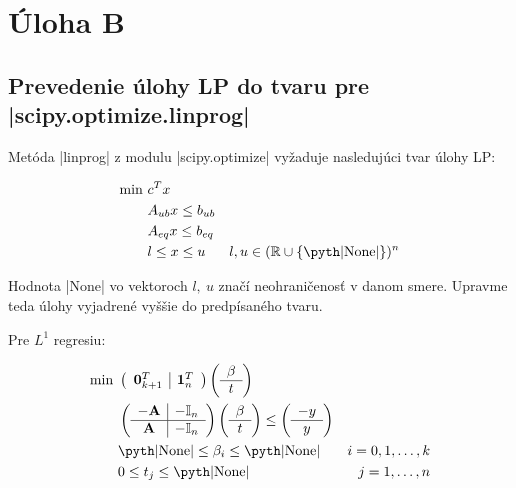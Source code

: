 \documentclass[report.tex]{subfiles}
\begin{document}
   

\section{Úloha B}\label{sec:B}


\subsection{Prevedenie úlohy LP do tvaru pre \pyth|scipy.optimize.linprog|}

Metóda \pyth|linprog| z modulu \pyth|scipy.optimize| vyžaduje nasledujúci tvar úlohy LP:

\begin{align*}
	\text{min}~ &c^Tx\\
	&A_{ub}x \leq b_{ub} \\
	&A_{eq}x \leq b_{eq} \\
	&l \leq x \leq u & l,u \in (\mathbb{R}\cup \{\text{\pyth|None|\}})^n 
\end{align*}

Hodnota \pyth|None| vo vektoroch $l,~u$ značí neohraničenosť v danom smere. Upravme teda úlohy vyjadrené vyššie do predpísaného tvaru.

Pre $L^1$ regresiu:

\begin{align*}
	\text{min}~ &
	\left(
	\begin{array}{c|c}
		\mathbf{0}_{k+1}^T & \mathbf{1}_n^T
	\end{array}
	\right)
	\left(
	\begin{array}{c}
		\beta \\
		\hline
		t
	\end{array}
	\right) \\
	&\left(
	\begin{array}{c|c}
		-\mathbf{A} & -\mathbb{I}_n \\
		\hline
		\mathbf{A} & -\mathbb{I}_n
	\end{array}
	\right)
	\left(
	\begin{array}{c}
		\beta \\
		\hline
		t
	\end{array}
	\right)
	\leq
	\left(
	\begin{array}{c}
		-y \\
		\hline
		y
	\end{array}
	\right) \\
	&\text{\pyth|None|} \leq \beta_i \leq \text{\pyth|None|} &i = 0,1,\dots,k\\
	&0 \leq t_j \leq \text{\pyth|None|} &j = 1,\dots,n
\end{align*}
\end{document}
